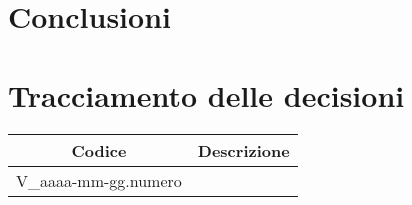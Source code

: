 \section{Conclusioni}

\newpage

\section*{Tracciamento delle decisioni}
	\renewcommand{\arraystretch}{1.8} %
	\begin{tabular}{ |c|l| }
		\hline
		\textbf{Codice} & \textbf{Descrizione} \\
		\hline
		V\_aaaa-mm-gg.numero & \\ %
		\hline
	\end{tabular}